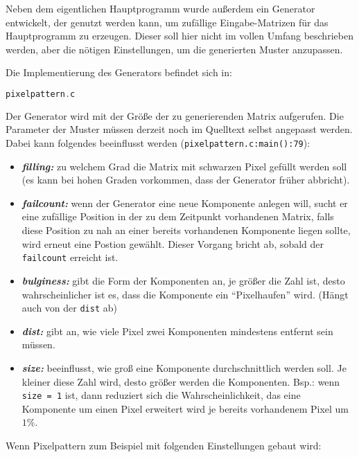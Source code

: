 \label{pixelpattern}

Neben dem eigentlichen Hauptprogramm wurde außerdem ein Generator entwickelt, der genutzt werden kann, um zufällige Eingabe-Matrizen für das Hauptprogramm zu erzeugen. Dieser soll hier nicht im vollen Umfang beschrieben werden, aber die nötigen Einstellungen, um die generierten Muster anzupassen.

Die Implementierung des Generators befindet sich in:

\begin{lstlisting}[language=C, aboveskip=\baselineskip, basicstyle=\footnotesize\ttfamily, lineskip=0pt]
pixelpattern.c
\end{lstlisting}

Der Generator wird mit der Größe der zu generierenden Matrix aufgerufen. Die Parameter der Muster müssen derzeit noch im Quelltext selbst angepasst werden. Dabei kann folgendes beeinflusst werden (\verb+pixelpattern.c:main():79+):

\begin{itemize}
	\item \textsl{\textbf{filling:}} zu welchem Grad die Matrix mit schwarzen Pixel gefüllt werden soll (es kann bei hohen Graden vorkommen, dass der Generator früher abbricht).
	\item \textsl{\textbf{failcount:}} wenn der Generator eine neue Komponente anlegen will, sucht er eine zufällige Position in der zu dem Zeitpunkt vorhandenen Matrix, falls diese Position zu nah an einer bereits vorhandenen Komponente liegen sollte, wird erneut eine Postion gewählt. Dieser Vorgang bricht ab, sobald der \verb+failcount+ erreicht ist.
	\item \textsl{\textbf{bulginess:}} gibt die Form der Komponenten an, je größer die Zahl ist, desto wahrscheinlicher ist es, dass die Komponente ein "`Pixelhaufen"' wird. (Hängt auch von der \verb+dist+ ab)
	\item \textsl{\textbf{dist:}} gibt an, wie viele Pixel zwei Komponenten mindestens entfernt sein müssen.
	\item \textsl{\textbf{size:}} beeinflusst, wie groß eine Komponente durchschnittlich werden soll. Je kleiner diese Zahl wird, desto größer werden die Komponenten. Bsp.: wenn \verb+size = 1+ ist, dann reduziert sich die Wahrscheinlichkeit, das eine Komponente um einen Pixel erweitert wird je bereits vorhandenem Pixel um $1\%$.
\end{itemize}

Wenn Pixelpattern zum Beispiel mit folgenden Einstellungen gebaut wird:

